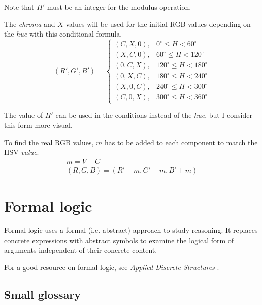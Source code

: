 \documentclass{article}
\begin{document}
Note that $H'$ must be an integer for the modulus operation.

The \textit{chroma} and $X$ values will be used for the initial RGB values
depending on the \textit{hue} with this conditional formula.
\begin{equation*}
  \left( R', G', B' \right) =
  \begin{cases}
    (C, X, 0), & 0^\circ \leq H < 60^\circ \\
    (X, C, 0), & 60^\circ \leq H < 120^\circ \\
    (0, C, X), & 120^\circ \leq H < 180^\circ \\
    (0, X, C), & 180^\circ \leq H < 240^\circ \\
    (X, 0, C), & 240^\circ \leq H < 300^\circ \\
    (C, 0, X), & 300^\circ \leq H < 360^\circ
  \end{cases}
\end{equation*}

The value of $H'$ can be used in the conditions instead of the \textit{hue}, but
I consider this form more visual.

To find the real RGB values, $m$ has to be added to each component to match the
HSV \textit{value}.
\begin{gather*}
  m = V - C \\
  (R, G, B) = (R' + m, G' + m, B' + m)
\end{gather*}

\section{Formal logic}

Formal logic uses a formal (i.e. abstract) approach to study reasoning. It
replaces concrete expressions with abstract symbols to examine the logical form
of arguments independent of their concrete content.

For a good resource on formal logic, see \textit{Applied Discrete Structures}
\cite{ads}.

\subsection{Small glossary}
\end{document}
